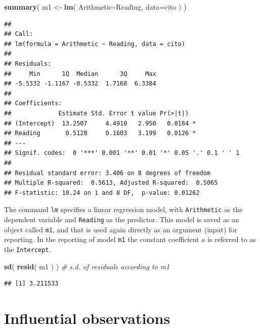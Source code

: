 \documentclass[
]{book}
\newenvironment{Shaded}{\begin{snugshade}}{\end{snugshade}}
\newcommand{\CommentTok}[1]{\textcolor[rgb]{0.56,0.35,0.01}{\textit{#1}}}
\newcommand{\DataTypeTok}[1]{\textcolor[rgb]{0.13,0.29,0.53}{#1}}
\newcommand{\KeywordTok}[1]{\textcolor[rgb]{0.13,0.29,0.53}{\textbf{#1}}}
\newcommand{\NormalTok}[1]{#1}
\newcommand{\OperatorTok}[1]{\textcolor[rgb]{0.81,0.36,0.00}{\textbf{#1}}}
\newcommand{\StringTok}[1]{\textcolor[rgb]{0.31,0.60,0.02}{#1}}
\begin{document}
\begin{Shaded}
\begin{Highlighting}[]
\KeywordTok{summary}\NormalTok{( m1 \textless{}{-}}\StringTok{ }\KeywordTok{lm}\NormalTok{( Arithmetic}\OperatorTok{\textasciitilde{}}\NormalTok{Reading, }\DataTypeTok{data=}\NormalTok{cito ) )}
\end{Highlighting}
\end{Shaded}

\begin{verbatim}
## 
## Call:
## lm(formula = Arithmetic ~ Reading, data = cito)
## 
## Residuals:
##     Min      1Q  Median      3Q     Max 
## -5.5332 -1.1167 -0.5332  1.7168  6.3384 
## 
## Coefficients:
##             Estimate Std. Error t value Pr(>|t|)  
## (Intercept)  13.2507     4.4910   2.950   0.0184 *
## Reading       0.5128     0.1603   3.199   0.0126 *
## ---
## Signif. codes:  0 '***' 0.001 '**' 0.01 '*' 0.05 '.' 0.1 ' ' 1
## 
## Residual standard error: 3.406 on 8 degrees of freedom
## Multiple R-squared:  0.5613, Adjusted R-squared:  0.5065 
## F-statistic: 10.24 on 1 and 8 DF,  p-value: 0.01262
\end{verbatim}

The command \texttt{lm} specifies a linear regression model, with \texttt{Arithmetic}
as the dependent variable and \texttt{Reading} as the predictor. This model is
saved as an object called \texttt{m1}, and that is used again directly as an argument
(input) for reporting. In the reporting of model \texttt{m1} the constant coefficient
\(a\) is referred to as the \texttt{Intercept}.

\begin{Shaded}
\begin{Highlighting}[]
\KeywordTok{sd}\NormalTok{( }\KeywordTok{resid}\NormalTok{( m1 ) ) }\CommentTok{\# s.d. of residuals according to \textasciigrave{}m1\textasciigrave{}}
\end{Highlighting}
\end{Shaded}

\begin{verbatim}
## [1] 3.211533
\end{verbatim}

\hypertarget{influential-observations}{%
\section{Influential observations}\label{influential-observations}}
\end{document}
